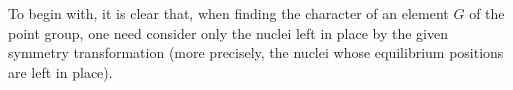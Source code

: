 To begin with, it is clear that, when finding the character of an element $G$ of the point group, one need consider only the nuclei left in place by the given symmetry transformation (more precisely, the nuclei whose equilibrium positions are left in place).
